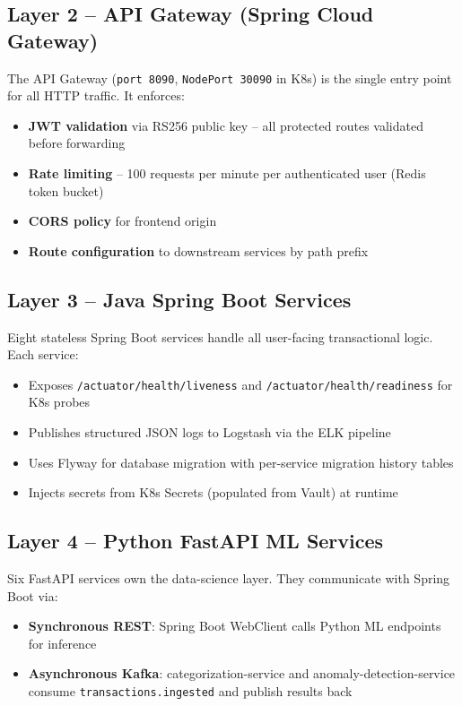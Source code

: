\documentclass[12pt,a4paper]{report}
\begin{document}
\subsection{Layer 2 -- API Gateway (Spring Cloud Gateway)}
The API Gateway (\texttt{port 8090}, \texttt{NodePort 30090} in K8s) is the single entry point for all HTTP traffic. It enforces:
\begin{itemize}[leftmargin=1.5em, noitemsep]
  \item \textbf{JWT validation} via RS256 public key -- all protected routes validated before forwarding
  \item \textbf{Rate limiting} -- 100 requests per minute per authenticated user (Redis token bucket)
  \item \textbf{CORS policy} for frontend origin
  \item \textbf{Route configuration} to downstream services by path prefix
\end{itemize}

\subsection{Layer 3 -- Java Spring Boot Services}
Eight stateless Spring Boot services handle all user-facing transactional logic. Each service:
\begin{itemize}[leftmargin=1.5em, noitemsep]
  \item Exposes \texttt{/actuator/health/liveness} and \texttt{/actuator/health/readiness} for K8s probes
  \item Publishes structured JSON logs to Logstash via the ELK pipeline
  \item Uses Flyway for database migration with per-service migration history tables
  \item Injects secrets from K8s Secrets (populated from Vault) at runtime
\end{itemize}

\subsection{Layer 4 -- Python FastAPI ML Services}
Six FastAPI services own the data-science layer. They communicate with Spring Boot via:
\begin{itemize}[leftmargin=1.5em, noitemsep]
  \item \textbf{Synchronous REST}: Spring Boot WebClient calls Python ML endpoints for inference
  \item \textbf{Asynchronous Kafka}: categorization-service and anomaly-detection-service consume \texttt{transactions.ingested} and publish results back
\end{itemize}
\end{document}
